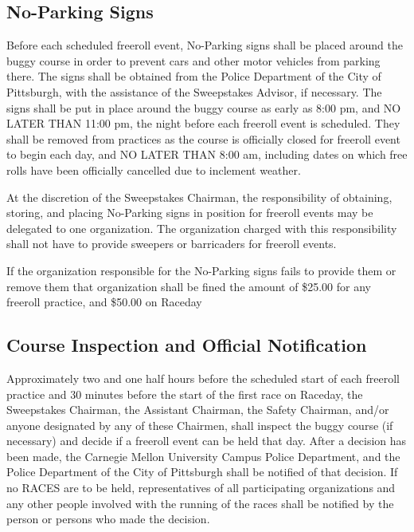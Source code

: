 	
\subsection{No-Parking Signs}
\label{subsec:NoParking}

	Before each scheduled freeroll event, No-Parking signs shall be placed
	around the buggy course in order to prevent cars and other motor vehicles from
	parking there. The signs shall be obtained from the Police Department of the
	City of Pittsburgh, with the assistance of the Sweepstakes Advisor, if
	necessary. The signs shall be put in place around the buggy course as early as
	8:00 pm, and NO LATER THAN 11:00 pm, the night before each freeroll event is
	scheduled. They shall be removed from practices as the course is officially closed for
	freeroll event to begin each day, and NO LATER THAN 8:00 am, including dates
	on which free rolls have been officially cancelled due to inclement weather.

	At the discretion of the Sweepstakes Chairman, the responsibility of obtaining,
	storing, and placing No-Parking signs in position for freeroll events may be
	delegated to one organization. The organization charged with this
	responsibility shall not have to provide sweepers or barricaders for freeroll
	events.

	If the organization responsible for the No-Parking signs fails to provide them
	or remove them that organization shall be fined the
	amount of \$25.00 for any freeroll practice, and \$50.00 on Raceday

	
\subsection{Course Inspection and Official Notification}

	Approximately two and one half hours before the scheduled start of each
	freeroll practice and 30 minutes before the start of the first race on Raceday,
	the Sweepstakes Chairman, the Assistant Chairman, the Safety
	Chairman, and/or anyone designated by any of these Chairmen, shall inspect the
	buggy course (if necessary) and decide if a freeroll event can be held that
	day. After a decision has been made, the Carnegie Mellon University Campus
	Police Department, and the Police Department of the City of Pittsburgh shall be
	notified of that decision. If no RACES are to be held,
	representatives of all participating organizations and any other people
	involved with the running of the races shall be notified by the person or
	persons who made the decision.


